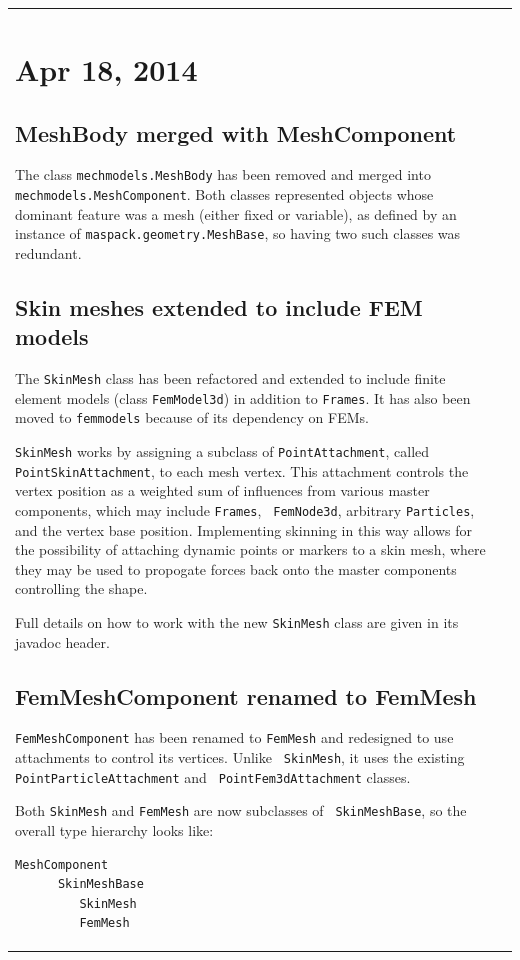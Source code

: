 \documentclass{article}
\begin{document}
\begin{tabular}{ll}
\section*{Apr 18, 2014}

\subsection*{MeshBody merged with MeshComponent}

The class {\tt mechmodels.MeshBody} has been removed and merged into
{\tt mechmodels.MeshComponent}. Both classes represented objects whose
dominant feature was a mesh (either fixed or variable), as defined by
an instance of {\tt maspack.geometry.MeshBase}, so having two such
classes was redundant.

\subsection*{Skin meshes extended to include FEM models}

The {\tt SkinMesh} class has been refactored and extended to include
finite element models (class {\tt FemModel3d}) in addition to {\tt Frames}.
It has also been moved to {\tt femmodels} because of its
dependency on FEMs.

{\tt SkinMesh} works by assigning a subclass of {\tt PointAttachment},
called {\tt PointSkinAttachment}, to each mesh vertex. This attachment
controls the vertex position as a weighted sum of influences from
various master components, which may include {\tt Frames}, {\tt
FemNode3d}, arbitrary {\tt Particles}, and the vertex base
position. Implementing skinning in this way allows for the possibility
of attaching dynamic points or markers to a skin mesh, where they may
be used to propogate forces back onto the master components
controlling the shape.

Full details on how to work with the new {\tt SkinMesh} class are
given in its javadoc header.

\subsection*{FemMeshComponent renamed to FemMesh}

{\tt FemMeshComponent} has been renamed to {\tt FemMesh} and
redesigned to use attachments to control its vertices. Unlike {\tt
SkinMesh}, it uses the existing {\tt PointParticleAttachment} and {\tt
PointFem3dAttachment} classes.

Both {\tt SkinMesh} and {\tt FemMesh} are now subclasses of {\tt
SkinMeshBase}, so the overall type hierarchy looks like:
\begin{lstlisting}[]
   MeshComponent
      SkinMeshBase
         SkinMesh
         FemMesh 
\end{lstlisting}


\end{tabular}
\end{document}
